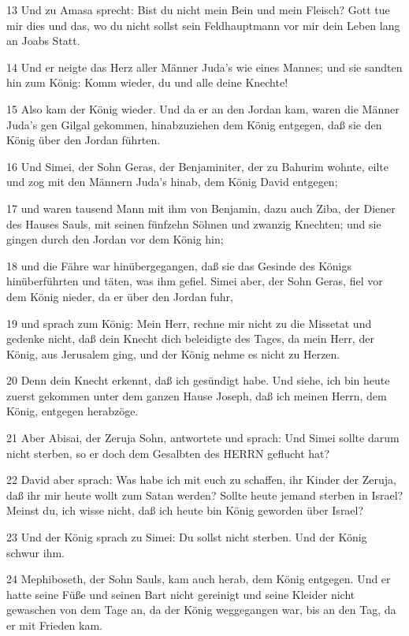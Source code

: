 \par 13 Und zu Amasa sprecht: Bist du nicht mein Bein und mein Fleisch? Gott tue mir dies und das, wo du nicht sollst sein Feldhauptmann vor mir dein Leben lang an Joabs Statt.
\par 14 Und er neigte das Herz aller Männer Juda's wie eines Mannes; und sie sandten hin zum König: Komm wieder, du und alle deine Knechte!
\par 15 Also kam der König wieder. Und da er an den Jordan kam, waren die Männer Juda's gen Gilgal gekommen, hinabzuziehen dem König entgegen, daß sie den König über den Jordan führten.
\par 16 Und Simei, der Sohn Geras, der Benjaminiter, der zu Bahurim wohnte, eilte und zog mit den Männern Juda's hinab, dem König David entgegen;
\par 17 und waren tausend Mann mit ihm von Benjamin, dazu auch Ziba, der Diener des Hauses Sauls, mit seinen fünfzehn Söhnen und zwanzig Knechten; und sie gingen durch den Jordan vor dem König hin;
\par 18 und die Fähre war hinübergegangen, daß sie das Gesinde des Königs hinüberführten und täten, was ihm gefiel. Simei aber, der Sohn Geras, fiel vor dem König nieder, da er über den Jordan fuhr,
\par 19 und sprach zum König: Mein Herr, rechne mir nicht zu die Missetat und gedenke nicht, daß dein Knecht dich beleidigte des Tages, da mein Herr, der König, aus Jerusalem ging, und der König nehme es nicht zu Herzen.
\par 20 Denn dein Knecht erkennt, daß ich gesündigt habe. Und siehe, ich bin heute zuerst gekommen unter dem ganzen Hause Joseph, daß ich meinen Herrn, dem König, entgegen herabzöge.
\par 21 Aber Abisai, der Zeruja Sohn, antwortete und sprach: Und Simei sollte darum nicht sterben, so er doch dem Gesalbten des HERRN geflucht hat?
\par 22 David aber sprach: Was habe ich mit euch zu schaffen, ihr Kinder der Zeruja, daß ihr mir heute wollt zum Satan werden? Sollte heute jemand sterben in Israel? Meinst du, ich wisse nicht, daß ich heute bin König geworden über Israel?
\par 23 Und der König sprach zu Simei: Du sollst nicht sterben. Und der König schwur ihm.
\par 24 Mephiboseth, der Sohn Sauls, kam auch herab, dem König entgegen. Und er hatte seine Füße und seinen Bart nicht gereinigt und seine Kleider nicht gewaschen von dem Tage an, da der König weggegangen war, bis an den Tag, da er mit Frieden kam.
